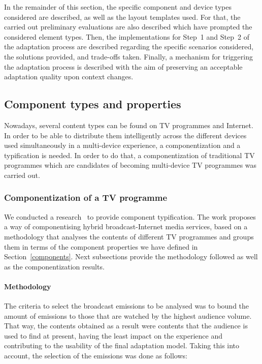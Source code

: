 In the remainder of this section, the specific component and device types considered are described, as well as the layout templates used. For that, the carried out preliminary evaluations are also described which have prompted the considered element types.
Then, the implementations for Step~1 and Step~2 of the adaptation process are described regarding the specific scenarios considered, the solutions provided, and trade-offs taken.
Finally, a mechanism for triggering the adaptation process is described with the aim of preserving an acceptable adaptation quality upon context changes. 

\subsection{Component types and properties} \label{imp_comp}

Nowadays, several content types can be found on TV programmes and Internet. In order to be able to distribute them intelligently across the different devices used simultaneously in a multi-device experience, a componentization and a typification is needed. In order to do that, a componentization of traditional TV programmes which are candidates of becoming multi-device TV programmes was carried out.

\subsubsection{Componentization of a TV programme}
We conducted a research~\cite{dominguez2018componentizing} to provide component typification. The work proposes a way of componentising hybrid broadcast-Internet media services, based on a methodology that analyses the contents of different TV programmes and groups them in terms of the component properties we have defined in Section~\ref{components}. Next subsections provide the methodology followed as well as the componentization results.

 
\paragraph{Methodology}
The criteria to select the broadcast emissions to be analysed was to bound the amount of emissions to those that are watched by the highest audience volume. That way, the contents obtained as a result were contents that the audience is used to find at present, having the least impact on the experience and contributing to the usability of the final adaptation model. Taking this into account, the selection of the emissions was done as follows:

